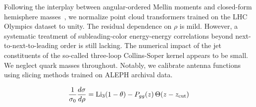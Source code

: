 Following the interplay between angular-ordered Mellin moments and
closed-form hemisphere
masses~\cite{TPC:0314-Novel-Optimal-Transport-Plans-for-PDF-Fitting-September-23-2026},
we normalize point cloud transformers trained on the LHC Olympics
dataset to unity. The residual dependence on $\rho$ is mild. However, a
systematic treatment of subleading-color energy-energy correlations
beyond next-to-next-to-leading order is still lacking. The numerical
impact of the jet constituents of the so-called three-loop Collins-Soper
kernel appears to be small. We neglect quark masses throughout. Notably,
we calibrate antenna functions using slicing methods trained on ALEPH
archival data.

\begin{equation}
  \frac{1}{\sigma_0} \frac{d\sigma}{d\rho} = \mathrm{Li}_{3}(1 - \theta) - P_{gg}(z) \, \Theta(z - z_{\rm cut})
  \label{eq:5}
\end{equation}

